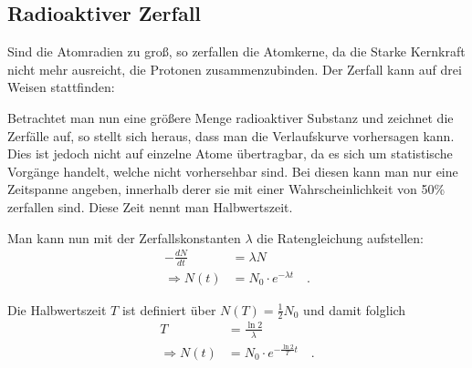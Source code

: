 \documentclass[12pt,a4paper,titlepage,headinclude,bibtotoc]{scrartcl}
\makeatletter
\DeclareRobustCommand{\chemical}[1]{%
  {\(\m@th
   \edef\resetfontdimens{\noexpand\)%
       \fontdimen16\textfont2=\the\fontdimen16\textfont2
       \fontdimen17\textfont2=\the\fontdimen17\textfont2\relax}%
   \fontdimen16\textfont2=2.7pt \fontdimen17\textfont2=2.7pt
   \mathrm{#1}%
   \resetfontdimens}}
\makeatother
\begin{document}
\subsection{Radioaktiver Zerfall}
Sind die Atomradien zu groß, so zerfallen die Atomkerne, da die Starke Kernkraft nicht mehr ausreicht, die Protonen zusammenzubinden.
Der Zerfall kann auf drei Weisen stattfinden:

Betrachtet man nun eine größere Menge radioaktiver Substanz und zeichnet die Zerfälle auf, so stellt sich heraus, dass man die Verlaufskurve vorhersagen kann.
Dies ist jedoch nicht auf einzelne Atome übertragbar, da es sich um statistische Vorgänge handelt, welche nicht vorhersehbar sind.
Bei diesen kann man nur eine Zeitspanne angeben, innerhalb derer sie mit einer Wahrscheinlichkeit von 50\% zerfallen sind.
Diese Zeit nennt man Halbwertszeit.

Man kann nun mit der Zerfallskonstanten $\lambda$ die Ratengleichung aufstellen:
\begin{align}
	-\frac{dN}{dt} &=\lambda N\\
	\Rightarrow N(t)&=N_0\cdot e^{-\lambda t}\quad .
\end{align}

Die Halbwertszeit $T$ ist definiert über $N(T)=\frac{1}{2}N_0$ und damit folglich
\begin{align}
	T&=\frac{\ln 2}{\lambda}\\
	\Rightarrow N(t)&=N_0\cdot e^{-\frac{\ln 2}{T} t}\quad .
\end{align}
\end{document}
